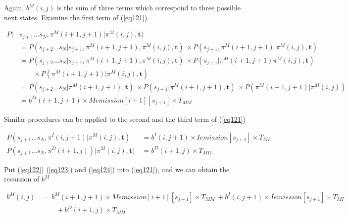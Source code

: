\documentclass[10pt]{article}
\begin{document}
    Again, $b^{M}(i, j)$ is the sum of three terms which correspond to three possible next states. Examine the first term of (\ref{eq121}).

    \begin{equation} \label{eq122}
    \begin{aligned}
      P(&s_{j+1}...s_N, \pi^M(i+1, j+1) | \pi^M(i, j), \mathbf{t}) \\
        &= P(s_{j+2}...s_N | s_{j+1}, \pi^M(i+1, j+1), \pi^M(i, j), \mathbf{t}) \
          \times P(s_{j+1}, \pi^M(i+1, j+1) | \pi^M(i, j), \mathbf{t}) \\
        &= P(s_{j+2}...s_N | s_{j+1}, \pi^M(i+1, j+1), \pi^M(i, j), \mathbf{t}) \
          \times P(s_{j+1} | \pi^M(i+1, j+1) \pi^M(i, j), \mathbf{t}) \\
          &\qquad\times P(\pi^M(i+1, j+1) | \pi^M(i, j), \mathbf{t}) \\
        &= P(s_{j+2}...s_N | \pi^M(i+1, j+1), \mathbf{t}) \
          \times P(s_{j+1} | \pi^M(i+1, j+1), \mathbf{t}) \
          \times P(\pi^M(i+1, j+1) | \pi^M(i, j)) \\
        &= b^M(i+1, j+1) \times Memission[i+1][s_{j+1}] \times T_{MM}
    \end{aligned}
    \end{equation}

    Similar procedures can be applied to the second and the third term of (\ref{eq121})

      \begin{align}
        P(s_{j+1}...s_N, \pi^I(i, j+1) | \pi^M(i, j), \mathbf{t}) \
          &= b^I(i, j+1) \times Iemission[s_{j+1}] \times T_{MI} \label{eq123}\\
        P(s_{j+1}...s_N, \pi^D(i+1, j)) | \pi^M(i, j), \mathbf{t}) \
          &= b^D(i+1, j) \times T_{MD} \label{eq124}
      \end{align}

    Put (\ref{eq122}) (\ref{eq123}) and (\ref{eq124}) into (\ref{eq121}), and we can obtain the recursion of $b^{M}$

    \begin{equation}
    \begin{aligned}
      b^M(i, j) \
        &= b^M(i+1, j+1) \times Memission[i+1][s_{j+1}] \times T_{MM} \
          + b^I(i, j+1) \times Iemission[s_{j+1}] \times T_{MI} \\
          &\qquad+ b^D(i+1, j) \times T_{MD}
    \end{aligned}
    \end{equation}
\end{document}

